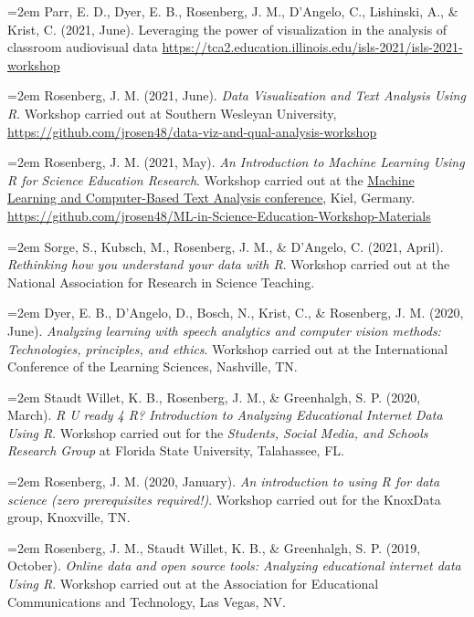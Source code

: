 \documentclass[
  14,
]{article}
\begin{document}
\hangindent=2em Parr, E. D., Dyer, E. B., Rosenberg, J. M., D'Angelo,
C., Lishinski, A., \& Krist, C. (2021, June). Leveraging the power of
visualization in the analysis of classroom audiovisual data
\url{https://tca2.education.illinois.edu/isls-2021/isls-2021-workshop}

\hangindent=2em Rosenberg, J. M. (2021, June). \emph{Data Visualization
and Text Analysis Using R}. Workshop carried out at Southern Wesleyan
University,
\url{https://github.com/jrosen48/data-viz-and-qual-analysis-workshop}

\hangindent=2em Rosenberg, J. M. (2021, May). \emph{An Introduction to
Machine Learning Using R for Science Education Research}. Workshop
carried out at the
\href{https://www.ipn.uni-kiel.de/en/the-ipn/news/gdcp-focus-conference-machine-learning-and-computer-based-text-analysis-may-6th-7th-2021-register-now}{Machine
Learning and Computer-Based Text Analysis conference}, Kiel, Germany.
\url{https://github.com/jrosen48/ML-in-Science-Education-Workshop-Materials}

\hangindent=2em Sorge, S., Kubsch, M., Rosenberg, J. M., \& D'Angelo, C.
(2021, April). \emph{Rethinking how you understand your data with R}.
Workshop carried out at the National Association for Research in Science
Teaching.

\hangindent=2em Dyer, E. B., D'Angelo, D., Bosch, N., Krist, C., \&
Rosenberg, J. M. (2020, June). \emph{Analyzing learning with speech
analytics and computer vision methods: Technologies, principles, and
ethics}. Workshop carried out at the International Conference of the
Learning Sciences, Nashville, TN.

\hangindent=2em Staudt Willet, K. B., Rosenberg, J. M., \& Greenhalgh,
S. P. (2020, March). \emph{R U ready 4 R? Introduction to Analyzing
Educational Internet Data Using R}. Workshop carried out for the
\emph{Students, Social Media, and Schools Research Group} at Florida
State University, Talahassee, FL.

\hangindent=2em Rosenberg, J. M. (2020, January). \emph{An introduction
to using R for data science (zero prerequisites required!)}. Workshop
carried out for the KnoxData group, Knoxville, TN.

\hangindent=2em Rosenberg, J. M., Staudt Willet, K. B., \& Greenhalgh,
S. P. (2019, October). \emph{Online data and open source tools:
Analyzing educational internet data Using R}. Workshop carried out at
the Association for Educational Communications and Technology, Las
Vegas, NV.
\end{document}
